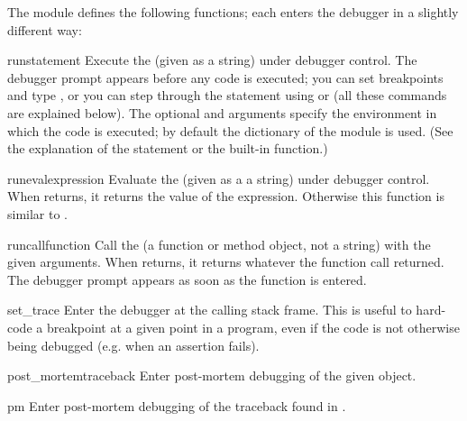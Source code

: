 The module defines the following functions; each enters the debugger
in a slightly different way:

\begin{funcdesc}{run}{statement}
Execute the  (given as a string) under debugger
control.  The debugger prompt appears before any code is executed; you
can set breakpoints and type , or you can step through
the statement using  or  (all these commands are
explained below).  The optional  and 
arguments specify the environment in which the code is executed; by
default the dictionary of the module  is used.  (See
the explanation of the  statement or the
 built-in function.)
\end{funcdesc}

\begin{funcdesc}{runeval}{expression}
Evaluate the  (given as a a string) under debugger
control.  When  returns, it returns the value of the
expression.  Otherwise this function is similar to
.
\end{funcdesc}

\begin{funcdesc}{runcall}{function}
Call the  (a function or method object, not a string)
with the given arguments.  When  returns, it returns
whatever the function call returned.  The debugger prompt appears as
soon as the function is entered.
\end{funcdesc}

\begin{funcdesc}{set_trace}{}
Enter the debugger at the calling stack frame.  This is useful to
hard-code a breakpoint at a given point in a program, even if the code
is not otherwise being debugged (e.g. when an assertion fails).
\end{funcdesc}

\begin{funcdesc}{post_mortem}{traceback}
Enter post-mortem debugging of the given  object.
\end{funcdesc}

\begin{funcdesc}{pm}{}
Enter post-mortem debugging of the traceback found in
.
\end{funcdesc}


